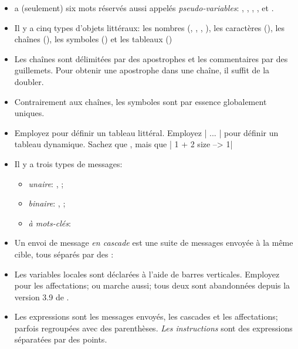 \documentclass[a4paper,10pt,twoside]{book}
\begin{document}
\begin{itemize}

\item	\sq a (seulement) six mots r\'{e}serv\'{e}s aussi appel\'{e}s
  \textit{pseudo-variables}: , , ,
  ,  et  .

\item	Il y a cinq types d'objets litt\'{e}raux: les nombres (,
  , \mbox{,} ), les caract\`{e}res (), les chaînes (), les symboles () et les tableaux ()

\item	Les chaînes sont d\'{e}limit\'{e}es par des apostrophes et les commentaires par des guillemets. Pour obtenir une apostrophe dans une chaîne, il suffit de la doubler.

\item	Contrairement aux chaînes, les symboles sont par essence globalement uniques.

\item	Employez  pour d\'{e}finir un tableau litt\'{e}ral.
		Employez \ct|{ ... }| pour d\'{e}finir un tableau dynamique.
		Sachez que
		, mais que 
		\ct|{ 1 + 2 } size --> 1|

\item	Il y a trois types de messages:
  \begin{itemize}
\item \emph{unaire}: \eg {}, ;
\item 		\emph{binaire}: \eg {}, ;
\item 		\emph{\`{a} mots-cl\'{e}s}: \eg {}%
      \end{itemize}
\item	Un envoi de message \emph{en cascade}  est une suite de messages envoy\'{e}e \`{a} la m\^{e}me cible, tous s\'{e}par\'{e}s par des \ct{;}:

\item	Les variables locales sont d\'{e}clar\'{e}es à l'aide de barres verticales.
		Employez \ct{:=} pour les affectations; \ct{_} ou
         marche aussi; tous deux sont abandonnées depuis la version 3.9 de \sq .

\item	Les expressions sont les messages envoy\'{e}s, les cascades et
  les affectations; parfois regroup\'{e}es avec des parenth\`{e}ses.
		\emph{Les instructions} sont des expressions s\'{e}parat\'{e}es par des points.


\end{itemize}
\end{document}
